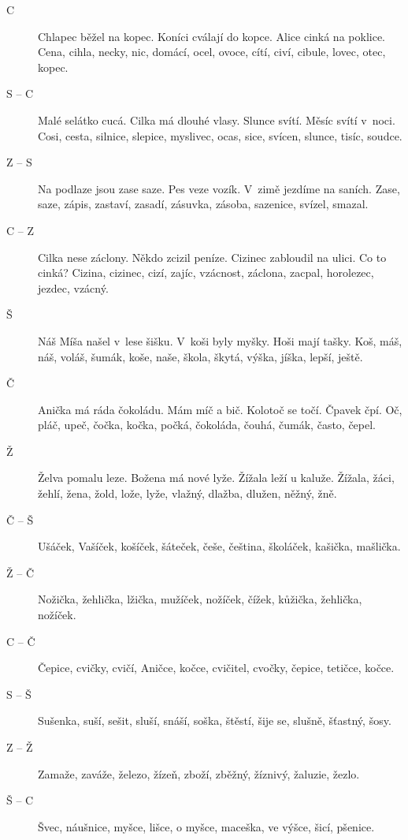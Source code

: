 \begin{multicols}{2}
\begin{description}
\item[C] Chlapec běžel na kopec. Koníci cválají do kopce. Alice cinká 
na poklice. Cena, cihla, necky, nic, domácí, ocel, ovoce, cítí, civí,
cibule, lovec, otec, kopec.

\item[S -- C] Malé selátko cucá. Cilka má dlouhé vlasy. Slunce svítí. 
Měsíc svítí v~noci. Cosi, cesta, silnice, slepice, myslivec, ocas,
sice, svícen, slunce, tisíc, soudce.

\item[Z -- S] Na podlaze jsou zase saze. Pes veze vozík. V~zimě 
jezdíme na saních. Zase, saze, zápis, zastaví, zasadí, zásuvka, zásoba, sazenice, svízel, smazal.

\item[C -- Z] Cilka nese záclony. Někdo zcizil peníze. Cizinec zabloudil 
na ulici. Co to cinká? Cizina, cizinec, cizí, zajíc, vzácnost, záclona,
zacpal, horolezec, jezdec, vzácný.

\item[Š] Náš Míša našel v~lese šišku. V~koši byly myšky. Hoši mají tašky.
Koš, máš, náš, voláš, šumák, koše, naše, škola, škytá, výška, jíška,
lepší, ještě.

\item[Č] Anička má ráda čokoládu. Mám míč a bič. Kolotoč se točí. Čpavek 
čpí. Oč, pláč, upeč, čočka, kočka, počká, čokoláda, čouhá, čumák, často,
čepel.

\item[Ž] Želva pomalu leze. Božena má nové lyže. Žížala leží u kaluže.
Žížala, žáci, žehlí, žena, žold, lože, lyže, vlažný, dlažba, dlužen, něžný,
žně.

\item[Č -- Š] Ušáček, Vašíček, košíček, šáteček, češe, čeština, školáček, 
kašička, mašlička.

\item[Ž -- Č] Nožička, žehlička, lžička, mužíček, nožíček, čížek, kůžička, 
žehlička, nožíček.

\item[C -- Č] Čepice, cvičky, cvičí, Aničce, kočce, cvičitel, cvočky, 
čepice, tetičce, kočce.

\item[S -- Š] Sušenka, suší, sešit, sluší, snáší, soška, štěstí, šije 
se, slušně, šťastný, šosy.

\item[Z -- Ž] Zamaže, zaváže, železo, žízeň, zboží, zběžný, žíznivý,
žaluzie, žezlo.

\item[Š -- C] Švec, náušnice, myšce, lišce, o myšce, maceška, ve výšce, 
šicí, pšenice.


\end{description}
\end{multicols}
